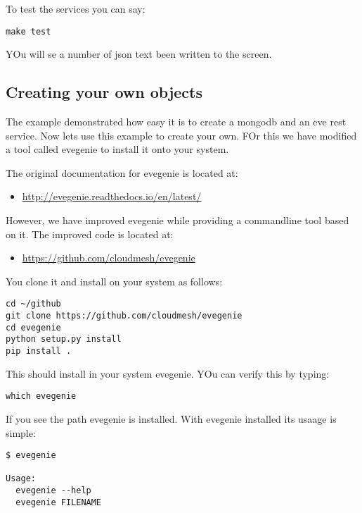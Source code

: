 To test the services you can say:

\begin{verbatim}
make test
\end{verbatim}

YOu will se a number of json text been written to the screen.

\subsection{Creating your own objects}\label{creating-your-own-objects}

The example demonstrated how easy it is to create a mongodb and an eve
rest service. Now lets use this example to create your own. FOr this we
have modified a tool called evegenie to install it onto your system.

The original documentation for evegenie is located at:

\begin{itemize}
\tightlist
\item
 \url{http://evegenie.readthedocs.io/en/latest/}
\end{itemize}

However, we have improved evegenie while providing a commandline tool
based on it. The improved code is located at:

\begin{itemize}
\tightlist
\item
 \url{https://github.com/cloudmesh/evegenie}
\end{itemize}

You clone it and install on your system as follows:

\begin{verbatim}
cd ~/github
git clone https://github.com/cloudmesh/evegenie
cd evegenie
python setup.py install
pip install .
\end{verbatim}

This should install in your system evegenie. YOu can verify this by
typing:

\begin{verbatim}
which evegenie
\end{verbatim}

If you see the path evegenie is installed. With evegenie installed its
usaage is simple:

\begin{verbatim}
$ evegenie

Usage:
  evegenie --help
  evegenie FILENAME
\end{verbatim}

